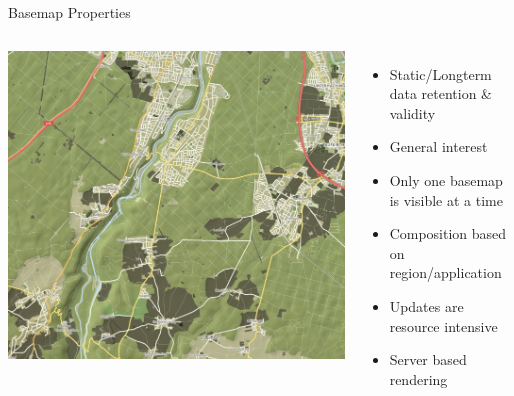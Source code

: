 \documentclass{beamer}
\begin{document}
\begin{frame}{Basemap Properties}
 \begin{columns}
   \includegraphics[scale=0.15]{images/basemap_tile}
   \begin{itemize}
    \item Static/Longterm data retention \& validity
    \item General interest
    \item Only one basemap is visible at a time
    \item Composition based on region/application
    \item Updates are resource intensive
    \item Server based rendering
   \end{itemize}
 \end{columns}
\end{frame}
\end{document}
